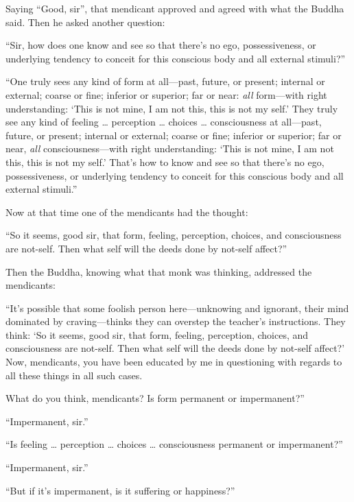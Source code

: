 \documentclass[12pt,openany]{book}%
\begin{document}
Saying “Good, sir”, that mendicant approved and agreed with what the Buddha said. Then he asked another question: 

“Sir, how does one know and see so that there’s no ego, possessiveness, or underlying tendency to conceit for this conscious body and all external stimuli?” 

“One truly sees any kind of form at all—past, future, or present; internal or external; coarse or fine; inferior or superior; far or near: \emph{all} form—with right understanding: ‘This is not mine, I am not this, this is not my self.’ They truly see any kind of feeling … perception … choices … consciousness at all—past, future, or present; internal or external; coarse or fine; inferior or superior; far or near, \emph{all} consciousness—with right understanding: ‘This is not mine, I am not this, this is not my self.’ That’s how to know and see so that there’s no ego, possessiveness, or underlying tendency to conceit for this conscious body and all external stimuli.” 

Now at that time one of the mendicants had the thought: 

“So it seems, good sir, that form, feeling, perception, choices, and consciousness are not-self. Then what self will the deeds done by not-self affect?” 

Then the Buddha, knowing what that monk was thinking, addressed the mendicants: 

“It’s possible that some foolish person here—unknowing and ignorant, their mind dominated by craving—thinks they can overstep the teacher’s instructions. They think: ‘So it seems, good sir, that form, feeling, perception, choices, and consciousness are not-self. Then what self will the deeds done by not-self affect?’ Now, mendicants, you have been educated by me in questioning with regards to all these things in all such cases. 

What do you think, mendicants? Is form permanent or impermanent?” 

“Impermanent, sir.” 

“Is feeling … perception … choices … consciousness permanent or impermanent?” 

“Impermanent, sir.” 

“But if it’s impermanent, is it suffering or happiness?” 
\end{document}
